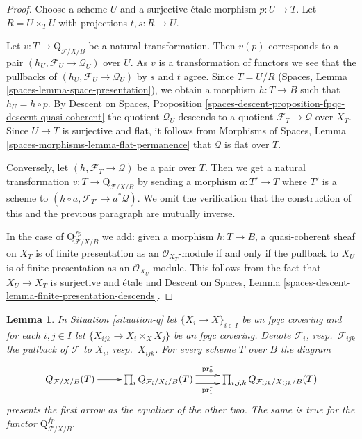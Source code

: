 \documentclass{stacks-project}
\theoremstyle{plain}
\newtheorem{lemma}[subsection]{Lemma}
\theoremstyle{definition}
\theoremstyle{remark}
\numberwithin{equation}{subsection}
\begin{document}
\begin{proof}
Choose a scheme $U$ and a surjective \'etale morphism $p : U \to T$.
Let $R = U \times_T U$ with projections $t, s : R \to U$.

\medskip\noindent
Let $v : T \to \text{Q}_{\mathcal{F}/X/B}$
be a natural transformation. Then $v(p)$ corresponds to a pair
$(h_U, \mathcal{F}_U \to \mathcal{Q}_U)$ over $U$.
As $v$ is a transformation of functors we see
that the pullbacks of $(h_U, \mathcal{F}_U \to \mathcal{Q}_U)$
by $s$ and $t$ agree.
Since $T = U/R$ (Spaces, Lemma \ref{spaces-lemma-space-presentation}),
we obtain a morphism $h : T \to B$ such that
$h_U = h \circ p$. By Descent on Spaces, Proposition
\ref{spaces-descent-proposition-fpqc-descent-quasi-coherent}
the quotient $\mathcal{Q}_U$ descends to a quotient
$\mathcal{F}_T \to \mathcal{Q}$ over $X_T$.
Since $U \to T$ is surjective and flat, it follows from
Morphisms of Spaces, Lemma \ref{spaces-morphisms-lemma-flat-permanence}
that $\mathcal{Q}$ is flat over $T$.

\medskip\noindent
Conversely, let $(h, \mathcal{F}_T \to \mathcal{Q})$ be a pair over $T$.
Then we get a natural transformation
$v : T \to \text{Q}_{\mathcal{F}/X/B}$
by sending a morphism $a : T' \to T$ where $T'$ is a scheme
to $(h \circ a, \mathcal{F}_{T'} \to a^*\mathcal{Q})$.
We omit the verification that the construction
of this and the previous paragraph are mutually inverse.

\medskip\noindent
In the case of $\text{Q}^{fp}_{\mathcal{F}/X/B}$ we
add: given a morphism $h : T \to B$, a quasi-coherent sheaf
on $X_T$ is of finite presentation as an $\mathcal{O}_{X_T}$-module
if and only if the pullback to $X_U$ is of finite presentation as an
$\mathcal{O}_{X_U}$-module. This follows from the fact that
$X_U \to X_T$ is surjective and \'etale and
Descent on Spaces, Lemma
\ref{spaces-descent-lemma-finite-presentation-descends}.
\end{proof}

\begin{lemma}
\label{lemma-q-sheaf-in-X}
In Situation \ref{situation-q} let $\{X_i \to X\}_{i \in I}$ be an fpqc
covering and for each $i, j \in I$ let $\{X_{ijk} \to X_i \times_X X_j\}$
be an fpqc covering. Denote $\mathcal{F}_i$, resp.\ $\mathcal{F}_{ijk}$
the pullback of $\mathcal{F}$ to $X_i$, resp.\ $X_{ijk}$. For every scheme
$T$ over $B$ the diagram
$$
\xymatrix{
Q_{\mathcal{F}/X/B}(T) \ar[r] &
\prod\nolimits_i
Q_{\mathcal{F}_i/X_i/B}(T)
\ar@<1ex>[r]^-{\text{pr}_0^*} \ar@<-1ex>[r]_-{\text{pr}_1^*}
&
\prod\nolimits_{i, j, k}
Q_{\mathcal{F}_{ijk}/X_{ijk}/B}(T)
}
$$
presents the first arrow as the equalizer of the other two.
The same is true for the functor $\text{Q}^{fp}_{\mathcal{F}/X/B}$.
\end{lemma}
\end{document}
